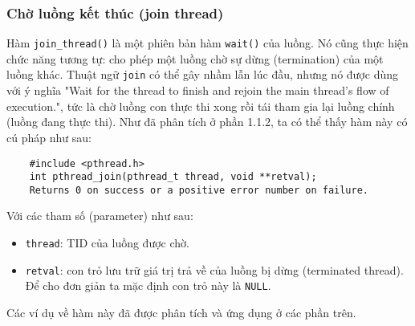 \documentclass{article}
\begin{document}
\subsubsection{Chờ luồng kết thúc (join thread)}
Hàm \verb|join_thread()| là một phiên bản hàm \verb|wait()| của luồng. Nó cũng thực hiện chức năng tương tự: cho phép
một luồng chờ sự dừng (termination) của một luồng khác. Thuật ngữ \verb|join| có thể gây nhầm lẫn lúc đầu, nhưng nó được
dùng với ý nghĩa "Wait for the thread to finish and rejoin the main thread's flow of execution.", tức là chờ luồng con thực thi xong rồi tái tham gia lại luồng
chính (luồng đang thực thi). Như đã phân tích ở phần 1.1.2, ta có thể thấy hàm này có cú pháp như sau:
\begin{verbatim}
    #include <pthread.h>
    int pthread_join(pthread_t thread, void **retval);
    Returns 0 on success or a positive error number on failure.
\end{verbatim}
Với các tham số (parameter) như sau:
\begin{itemize}
    \item \verb|thread|: TID của luồng được chờ.
    \item \verb|retval|: con trỏ lưu trữ giá trị trả về của luồng bị dừng (terminated thread). Để cho đơn giản
ta mặc định con trỏ này là \verb|NULL|.
\end{itemize}
Các ví dụ về hàm này đã được phân tích và ứng dụng ở các phần trên.
\end{document}
